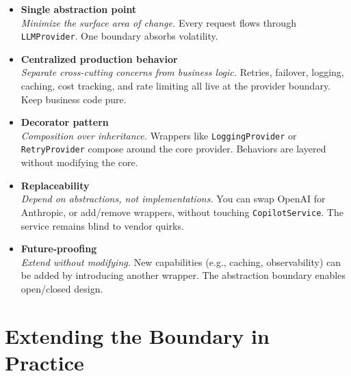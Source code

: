 \documentclass[11pt]{article}
\begin{document}
\begin{itemize}[leftmargin=*, itemsep=0.15in]

\item \textbf{Single abstraction point} \\
\textit{Minimize the surface area of change.} Every request flows through \texttt{LLMProvider}. One boundary absorbs volatility.

\item \textbf{Centralized production behavior} \\
\textit{Separate cross-cutting concerns from business logic.} Retries, failover, logging, caching, cost tracking, and rate limiting all live at the provider boundary. Keep business code pure.

\item \textbf{Decorator pattern} \\
\textit{Composition over inheritance.} Wrappers like \texttt{LoggingProvider} or \texttt{RetryProvider} compose around the core provider. Behaviors are layered without modifying the core.

\item \textbf{Replaceability} \\
\textit{Depend on abstractions, not implementations.} You can swap OpenAI for Anthropic, or add/remove wrappers, without touching \texttt{CopilotService}. The service remains blind to vendor quirks.

\item \textbf{Future-proofing} \\
\textit{Extend without modifying.} New capabilities (e.g., caching, observability) can be added by introducing another wrapper. The abstraction boundary enables open/closed design.

\end{itemize}

\newpage


\section*{Extending the Boundary in Practice}
\vspace{0.15in}
\end{document}
